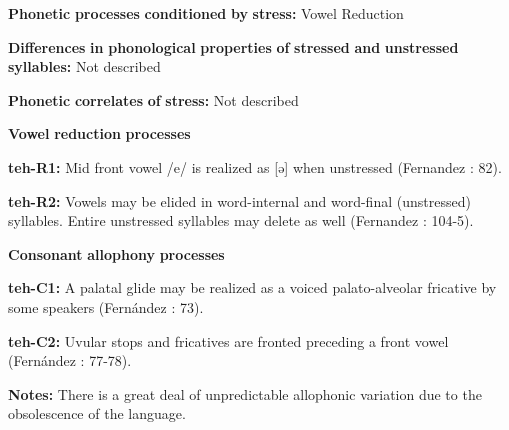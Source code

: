 \begin{styleBody}
\textbf{Phonetic} \textbf{processes} \textbf{conditioned} \textbf{by} \textbf{stress:} Vowel Reduction
\end{styleBody}

\begin{styleBody}
\textbf{Differences} \textbf{in} \textbf{phonological} \textbf{properties} \textbf{of} \textbf{stressed} \textbf{and} \textbf{unstressed} \textbf{syllables:} Not described
\end{styleBody}

\begin{styleBody}
\textbf{Phonetic} \textbf{correlates} \textbf{of} \textbf{stress:} Not described
\end{styleBody}

\begin{styleBody}
\textbf{Vowel} \textbf{reduction} \textbf{processes}
\end{styleBody}

\begin{styleBody}
\textbf{teh-R1:} Mid front vowel /e/ is realized as [ə] when unstressed (Fernandez \citealt{Garay1998}: 82).
\end{styleBody}

\begin{styleBody}
\textbf{teh-R2:} Vowels may be elided in word-internal and word-final (unstressed) syllables. Entire unstressed syllables may delete as well (Fernandez \citealt{Garay1998}: 104-5).
\end{styleBody}

\begin{styleBody}
\textbf{Consonant} \textbf{allophony} \textbf{processes}
\end{styleBody}

\begin{styleBody}
\textbf{teh-C1:} A palatal glide may be realized as a voiced palato-alveolar fricative by some speakers (Fernández \citealt{Garay1998}: 73).
\end{styleBody}

\begin{styleBody}
\textbf{teh-C2:} Uvular stops and fricatives are fronted preceding a front vowel (Fernández \citealt{Garay1998}: 77-78).
\end{styleBody}

\begin{styleBody}
\textbf{Notes:} There is a great deal of unpredictable allophonic variation due to the obsolescence of the language.
\end{styleBody}

